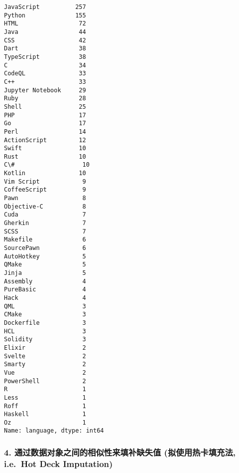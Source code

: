 \documentclass[11pt]{article}
\makeatletter
\newcommand{\boxspacing}{\kern\kvtcb@left@rule\kern\kvtcb@boxsep}
\newcommand{\prompt}[4]{
        {\ttfamily\llap{{\color{#2}[#3]:\hspace{3pt}#4}}\vspace{-\baselineskip}}
    }
\makeatother
\begin{document}
            \begin{tcolorbox}[breakable, size=fbox, boxrule=.5pt, pad at break*=1mm, opacityfill=0]
\prompt{Out}{outcolor}{14}{\boxspacing}
\begin{Verbatim}[commandchars=\\\{\}]
JavaScript          257
Python              155
HTML                 72
Java                 44
CSS                  42
Dart                 38
TypeScript           38
C                    34
CodeQL               33
C++                  33
Jupyter Notebook     29
Ruby                 28
Shell                25
PHP                  17
Go                   17
Perl                 14
ActionScript         12
Swift                10
Rust                 10
C\#                   10
Kotlin               10
Vim Script            9
CoffeeScript          9
Pawn                  8
Objective-C           8
Cuda                  7
Gherkin               7
SCSS                  7
Makefile              6
SourcePawn            6
AutoHotkey            5
QMake                 5
Jinja                 5
Assembly              4
PureBasic             4
Hack                  4
QML                   3
CMake                 3
Dockerfile            3
HCL                   3
Solidity              3
Elixir                2
Svelte                2
Smarty                2
Vue                   2
PowerShell            2
R                     1
Less                  1
Roff                  1
Haskell               1
Oz                    1
Name: language, dtype: int64
\end{Verbatim}
\end{tcolorbox}
        
    \subsubsection{4. 通过数据对象之间的相似性来填补缺失值
(拟使用热卡填充法, i.e.~Hot Deck
Imputation)}\label{ux901aux8fc7ux6570ux636eux5bf9ux8c61ux4e4bux95f4ux7684ux76f8ux4f3cux6027ux6765ux586bux8865ux7f3aux5931ux503c-ux62dfux4f7fux7528ux70edux5361ux586bux5145ux6cd5-i.e.-hot-deck-imputation}
\end{document}
